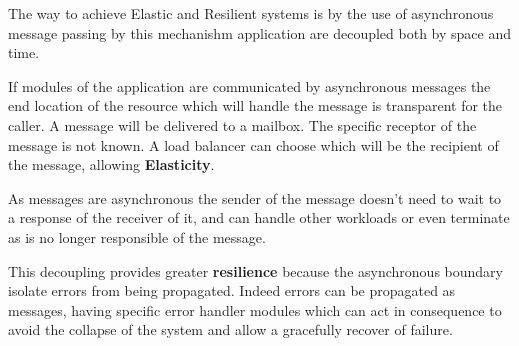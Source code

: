\documentclass[../main.tex]{subfiles}
\begin{document}
The way to achieve Elastic and Resilient systems is by the use of asynchronous
message passing by this mechanishm application are decoupled both by space
and time.

If modules of the application are communicated by asynchronous messages the end
location of the resource which will handle the message is transparent for the
caller. A message will be delivered to a mailbox. The specific receptor of the
message is not known. A load balancer can choose which will be the recipient of
the message, allowing \textbf{Elasticity}.

As messages are asynchronous the sender of the message doesn't need to wait to a
response of the receiver of it, and can handle other workloads or even terminate
as is no longer responsible of the message.

This decoupling provides greater \textbf{resilience} because the asynchronous
boundary isolate errors from being propagated. Indeed errors can be propagated
as messages, having specific error handler modules which can act in consequence
to avoid the collapse of the system and allow a gracefully recover of failure.
\end{document}
